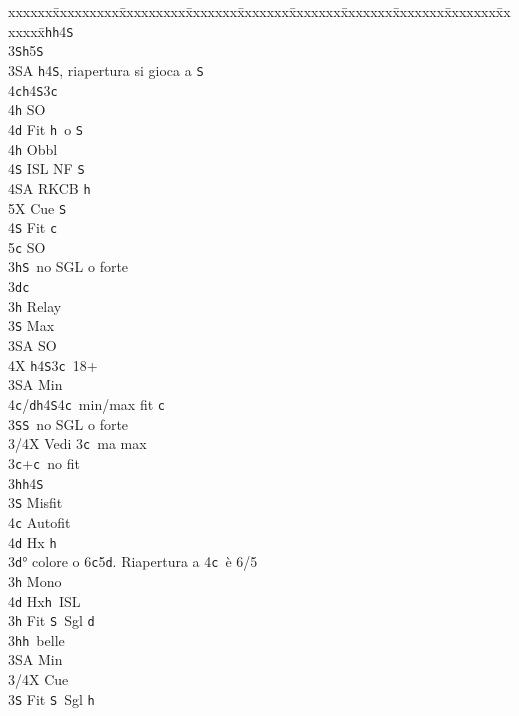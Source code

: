 \documentclass[a4paper,italian]{article}
\newcommand{\BS}{\small{\texttt{S}}}
\newcommand{\BC}{\small{\texttt{c}}}
\newcommand{\BD}{\small{\texttt{d}}}
\newcommand{\BH}{\small{\texttt{h}}}
\newenvironment{bidtable}
{\begin{tabbing}

    xxxxxx\=xxxxxxxxx\=xxxxxxxxx\=xxxxxxx\=xxxxxxx\=xxxxxxx\=xxxxxxx\=xxxxxxx\=xxxxxxx\=xxxxxxx\=\kill}
{\end{tabbing} }%
\begin{document}
\begin{multicols}{2}
\begin{bidtable}
        3\BH {}\BH 4\BS \\
        3\BS {}\BH 5\BS \\
        3\small{SA} \BH 4\BS , riapertura si gioca a \BS \\
        4\BC {}\BH 4\BS 3\BC \+\\
        4\BH \> SO\\
        4\BD \> Fit \BH\ o \BS \+\\
        4\BH \> Obbl\+\\
        4\BS \> ISL NF \BS \\
        4\small{SA} \> RKCB \BH \\
        5X \> Cue \BS \-\-\\
        4\BS \> Fit \BC \\
        5\BC \> SO\-\-\\
        3\BH {}\BS\ no SGL o forte\-\\
        3\BD {}\BC \+\\
        3\BH \> Relay\+\\
        3\BS \> Max\+\\
        3\small{SA} \> SO\+\\
        4X \BH4\BS3\BC\ 18+\-\-\\
        3\small{SA} \> Min\\
        4\BC/\BD {}\BH 4\BS 4\BC\ min/max fit \BC \-\\
        3\BS {}\BS\ no SGL o forte\-\\
        3/4X \> Vedi 3\BC\ ma max\-\\
        3\BC {}+\BC\ no fit\+\\
        3\BH {}\BH 4\BS \+\\
        3\BS \> Misfit\\
        4\BC \> Autofit\\
        4\BD \> Hx \BH \-\-\\
        3\BD {}° colore o 6\BC 5\BD . Riapertura a 4\BC\ è 6/5\+\\
        3\BH \> Mono\+\\
        4\BD \> Hx\BH\ ISL\-\-\\
        3\BH \> Fit \BS\ Sgl \BD \+\\
        3\BH {}\BH\ belle\\
        3\small{SA} \> Min\\
        3/4X \> Cue\-\\
        3\BS \> Fit \BS\ Sgl \BH \-\\
    \end{bidtable}

\end{multicols}
\end{document}
